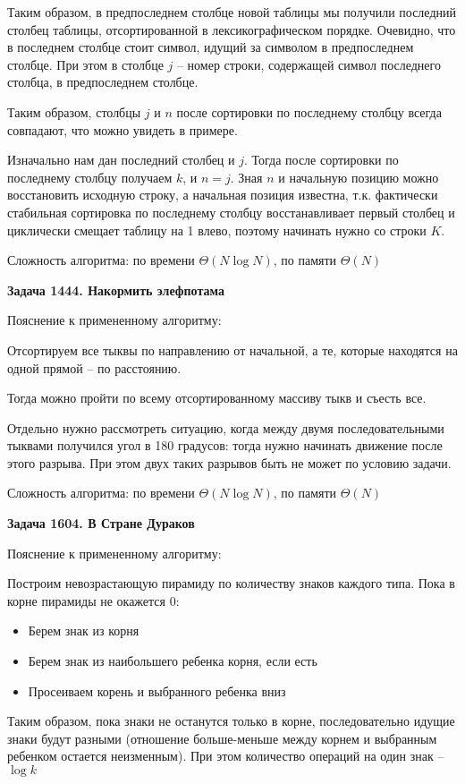 \documentclass[12pt,a4paper]{article}
\begin{document}
    Таким образом, в предпоследнем столбце новой таблицы мы получили последний столбец таблицы,
    отсортированной в лексикографическом порядке.
    Очевидно, что в последнем столбце стоит символ, идущий за символом в предпоследнем столбце.
    При этом в столбце $j$ -- номер строки, содержащей символ последнего столбца, в предпоследнем столбце.

    Таким образом, столбцы $j$ и $n$ после сортировки по последнему столбцу всегда совпадают, что можно увидеть в примере.

    Изначально нам дан последний столбец и $j$.
    Тогда после сортировки по последнему столбцу получаем $k$, и $n=j$.
    Зная $n$ и начальную позицию можно восстановить исходную строку,
    а начальная позиция известна, т.к. фактически стабильная сортировка по последнему столбцу
    восстанавливает первый столбец и циклически смещает таблицу на 1 влево,
    поэтому начинать нужно со строки $K$.

    Сложность алгоритма: по времени $\Theta(N\log N)$, по памяти $\Theta(N)$

    \bigskip

    \textbf{Задача 1444. Накормить элефпотама}

    Пояснение к примененному алгоритму:

    Отсортируем все тыквы по направлению от начальной, а те, которые находятся на одной прямой -- по расстоянию.

    Тогда можно пройти по всему отсортированному массиву тыкв и съесть все.

    Отдельно нужно рассмотреть ситуацию, когда между двумя последовательными тыквами получился угол в 180 градусов:
    тогда нужно начинать движение после этого разрыва.
    При этом двух таких разрывов быть не может по условию задачи.

    Сложность алгоритма: по времени $\Theta(N\log N)$, по памяти $\Theta(N)$

    \bigskip

    \textbf{Задача 1604. В Стране Дураков}

    Пояснение к примененному алгоритму:

    Построим невозрастающую пирамиду по количеству знаков каждого типа.
    Пока в корне пирамиды не окажется 0:
    \begin{itemize}
        \item Берем знак из корня
        \item Берем знак из наибольшего ребенка корня, если есть
        \item Просеиваем корень и выбранного ребенка вниз
    \end{itemize}
    Таким образом, пока знаки не останутся только в корне,
    последовательно идущие знаки будут разными
    (отношение больше-меньше между корнем и выбранным ребенком остается неизменным).
    При этом количество операций на один знак -- $\log k$
\end{document}
